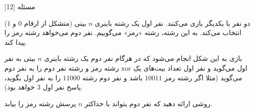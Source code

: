 ‌مسئله [12]


% 
%
%
% 



دو نفر با یکدیگر بازی می‌کنند. نفر اول یک رشته باینری 
$n$
بیتی (متشکل از ارقام
$0$ 
و
$1$)
انتخاب می‌کند. به این رشته، رشته «رمز» می‌گوییم.
نفر دوم می‌خواهد رشته رمز را پیدا کند.

بازی به این شکل انجام می‌شود که در هرگام نفر دوم یک رشته باینری 
$n$
بیتی به نفر اول می‌گوید و نفر اول تعداد بیت‌های یکِ
$\text{xor}$
رشته رمز و رشته نفر دوم را به نفر دوم می‌گوید
(مثلا اگر رشته رمز 
$10011$
باشد و نفر دوم رشته 
$11000$
را به نفر اول بگوید، پاسخ نفر اول
$3$
خواهد بود).

روشی ارائه دهید که نفر دوم بتواند با حداکثر
$n$
پرسش رشته رمز را بیابد.

